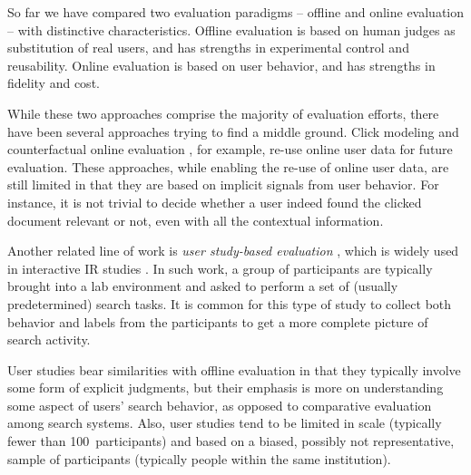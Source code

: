 So far we have compared two evaluation paradigms -- offline and online evaluation -- with distinctive characteristics. Offline evaluation is based on human judges as substitution of real users, and has strengths in experimental control and reusability. Online evaluation is based on user behavior, and has strengths in fidelity and cost.


While these two approaches comprise the majority of evaluation efforts, there have been several approaches trying to find a middle ground. Click modeling \citep{chuklin2015click} and counterfactual online evaluation \citep{Li:2015, li2010contextual}, for example, re-use online user data for future evaluation. These approaches, while enabling the re-use of online user data, are still limited in that they are based on implicit signals from user behavior. For instance, it is not trivial to decide whether a user indeed found the clicked document relevant or not, even with all the contextual information.
%

Another related line of work is \textit{user study-based evaluation} \citep{Bron:2013, Liu:2014, Shah:2011}, which is widely used in interactive IR studies \citep{kelly2009methods}. In such work, a group of participants are typically brought into a lab environment and asked to perform a set of (usually predetermined) search tasks. It is common for this type of study to collect both behavior and labels from the participants to get a more complete picture of search activity. 

User studies bear similarities with offline evaluation in that they typically involve some form of explicit judgments, but their emphasis is more on understanding some aspect of users' search behavior, as opposed to comparative evaluation among search systems. Also, user studies tend to be limited in scale (typically fewer than 100~participants) and based on a biased, possibly not representative, sample of participants (typically people within the same institution).
%

